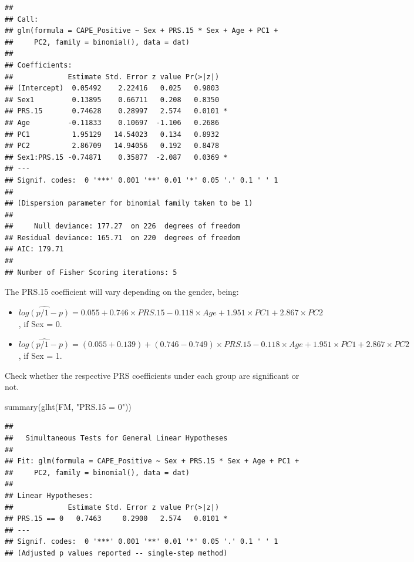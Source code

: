 \documentclass[
]{article}
\newenvironment{Shaded}{\begin{snugshade}}{\end{snugshade}}
\newcommand{\FunctionTok}[1]{\textcolor[rgb]{0.00,0.00,0.00}{#1}}
\newcommand{\NormalTok}[1]{#1}
\newcommand{\StringTok}[1]{\textcolor[rgb]{0.31,0.60,0.02}{#1}}
\providecommand{\tightlist}{%
  \setlength{\itemsep}{0pt}\setlength{\parskip}{0pt}}
\begin{document}
\begin{verbatim}
## 
## Call:
## glm(formula = CAPE_Positive ~ Sex + PRS.15 * Sex + Age + PC1 + 
##     PC2, family = binomial(), data = dat)
## 
## Coefficients:
##             Estimate Std. Error z value Pr(>|z|)  
## (Intercept)  0.05492    2.22416   0.025   0.9803  
## Sex1         0.13895    0.66711   0.208   0.8350  
## PRS.15       0.74628    0.28997   2.574   0.0101 *
## Age         -0.11833    0.10697  -1.106   0.2686  
## PC1          1.95129   14.54023   0.134   0.8932  
## PC2          2.86709   14.94056   0.192   0.8478  
## Sex1:PRS.15 -0.74871    0.35877  -2.087   0.0369 *
## ---
## Signif. codes:  0 '***' 0.001 '**' 0.01 '*' 0.05 '.' 0.1 ' ' 1
## 
## (Dispersion parameter for binomial family taken to be 1)
## 
##     Null deviance: 177.27  on 226  degrees of freedom
## Residual deviance: 165.71  on 220  degrees of freedom
## AIC: 179.71
## 
## Number of Fisher Scoring iterations: 5
\end{verbatim}

The PRS.15 coefficient will vary depending on the gender, being:

\begin{itemize}
\tightlist
\item
  \(\widehat{log(p/1-p)} = 0.055 + 0.746\times PRS.15 - 0.118\times Age + 1.951\times PC1 + 2.867\times PC2\),
  if Sex = 0.
\item
  \(\widehat{log(p/1-p)} = (0.055 + 0.139) + (0.746 - 0.749)\times PRS.15 - 0.118\times Age + 1.951\times PC1 + 2.867\times PC2\),
  if Sex = 1.
\end{itemize}

Check whether the respective PRS coefficients under each group are
significant or not.

\begin{Shaded}
\begin{Highlighting}[]
\FunctionTok{summary}\NormalTok{(}\FunctionTok{glht}\NormalTok{(FM, }\StringTok{"PRS.15 = 0"}\NormalTok{))}
\end{Highlighting}
\end{Shaded}

\begin{verbatim}
## 
##   Simultaneous Tests for General Linear Hypotheses
## 
## Fit: glm(formula = CAPE_Positive ~ Sex + PRS.15 * Sex + Age + PC1 + 
##     PC2, family = binomial(), data = dat)
## 
## Linear Hypotheses:
##             Estimate Std. Error z value Pr(>|z|)  
## PRS.15 == 0   0.7463     0.2900   2.574   0.0101 *
## ---
## Signif. codes:  0 '***' 0.001 '**' 0.01 '*' 0.05 '.' 0.1 ' ' 1
## (Adjusted p values reported -- single-step method)
\end{verbatim}
\end{document}
